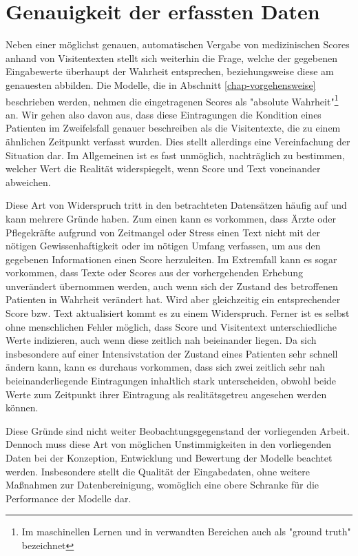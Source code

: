 \section{Genauigkeit der erfassten Daten}\label{section:genauigkeit_der_daten}
Neben einer möglichst genauen, automatischen Vergabe von medizinischen Scores anhand von Visitentexten stellt sich weiterhin die Frage, welche der gegebenen Eingabewerte überhaupt der Wahrheit entsprechen, beziehungsweise diese am genauesten abbilden. Die Modelle, die in Abschnitt \ref{chap-vorgehensweise} beschrieben werden, nehmen die eingetragenen Scores als "absolute Wahrheit"\footnote{Im maschinellen Lernen und in verwandten Bereichen auch als "ground truth" bezeichnet} an. Wir gehen also davon aus, dass diese Eintragungen die Kondition eines Patienten im Zweifelsfall genauer beschreiben als die Visitentexte, die zu einem ähnlichen Zeitpunkt verfasst wurden. Dies stellt allerdings eine Vereinfachung der Situation dar. Im Allgemeinen ist es fast unmöglich, nachträglich zu bestimmen, welcher Wert die Realität widerspiegelt, wenn Score und Text voneinander abweichen. 

Diese Art von Widerspruch tritt in den betrachteten Datensätzen häufig auf und kann mehrere Gründe haben. Zum einen kann es vorkommen, dass Ärzte oder Pflegekräfte aufgrund von Zeitmangel oder Stress einen Text nicht mit der nötigen Gewissenhaftigkeit oder im nötigen Umfang verfassen, um aus den gegebenen Informationen einen Score herzuleiten. Im Extremfall kann es sogar vorkommen, dass Texte oder Scores aus der vorhergehenden Erhebung unverändert übernommen werden, auch wenn sich der Zustand des betroffenen Patienten in Wahrheit verändert hat. Wird aber gleichzeitig ein entsprechender Score bzw. Text aktualisiert kommt es zu einem Widerspruch. Ferner ist es selbst ohne menschlichen Fehler möglich, dass Score und Visitentext unterschiedliche Werte indizieren, auch wenn diese zeitlich nah beieinander liegen. Da sich insbesondere auf einer Intensivstation der Zustand eines Patienten sehr schnell ändern kann, kann es durchaus vorkommen, dass sich zwei zeitlich sehr nah beieinanderliegende Eintragungen inhaltlich stark unterscheiden, obwohl beide Werte zum Zeitpunkt ihrer Eintragung als realitätsgetreu angesehen werden können.

Diese Gründe sind nicht weiter Beobachtungsgegenstand der vorliegenden Arbeit. Dennoch muss diese Art von möglichen Unstimmigkeiten in den vorliegenden Daten bei der Konzeption, Entwicklung und Bewertung der Modelle beachtet werden. Insbesondere stellt die Qualität der Eingabedaten, ohne weitere Maßnahmen zur Datenbereinigung, womöglich eine obere Schranke für die Performance der Modelle dar.